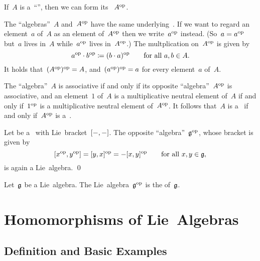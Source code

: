 \begin{recall}
	If~$A$ is a~\enquote{\algebra{$\kf$}}, then we can form its ~$A^{\mathrm{op}}$.

	The \enquote{algebras}~$A$ and~$A^{\mathrm{op}}$ have the same underlying~\vectorspace{$\kf$}.
	If we want to regard an element~$a$ of~$A$ as an element of~$A^{\mathrm{op}}$ then we write~$a^{\mathrm{op}}$ instead.
	(So~$a = a^{\mathrm{op}}$ but~$a$ lives in~$A$ while~$a^{\mathrm{op}}$ lives in~$A^{\mathrm{op}}$.)
	The multplication on~$A^{\mathrm{op}}$ is given by
	\[
		a^{\mathrm{op}} \cdot b^{\mathrm{op}}
		\coloneqq
		(b \cdot a)^{\mathrm{op}}
		\qquad
		\text{for all~$a, b \in A$.}
	\]
	It holds that~$(A^{\mathrm{op}})^{\mathrm{op}} = A$, and~$(a^{\mathrm{op}})^{\mathrm{op}} = a$ for every element~$a$ of~$A$.

	The \enquote{algebra}~$A$ is associative if and only if its opposite \enquote{algebra}~$A^{\mathrm{op}}$ is associative, and an element~$1$ of~$A$ is a multiplicative neutral element of~$A$ if and only if~$1^{\mathrm{op}}$ is a multiplicative neutral element of~$A^{\mathrm{op}}$.
	It follows that~$A$ is a~{\algebra{$\kf$}} if and only if~$A^{\mathrm{op}}$ is a~\algebra{$\kf$}.
\end{recall}


\begin{proposition}
	Let be a~\liealgebra{$\kf$} with Lie~bracket~$[-, -]$.
	The opposite \enquote{algebra}~$\mathfrak{g}^{\mathrm{op}}$, whose bracket is given by
	\[
		[x^{\mathrm{op}}, y^{\mathrm{op}}]
		=
		[y,x]^{\mathrm{op}}
		=
		-[x,y]^{\mathrm{op}}
		\qquad
		\text{for all~$x, y \in \mathfrak{g}$,}
	\]
	is again a Lie~algebra.
	\qed
\end{proposition}


\begin{definition}
	Let~$\mathfrak{g}$ be a Lie~algebra.
	The Lie~algebra~$\mathfrak{g}^{\mathrm{op}}$ is the  of~$\mathfrak{g}$.
\end{definition}





\section{Homomorphisms of Lie~Algebras}



\subsection{Definition and Basic Examples}


